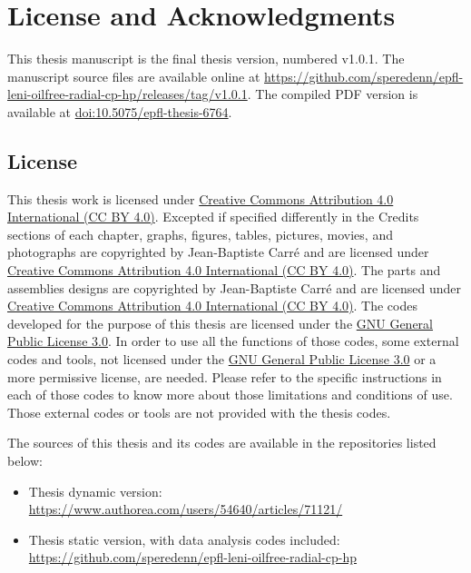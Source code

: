 \chapter{License and Acknowledgments}
\label{chap:licenses}

This thesis manuscript is the final thesis version, numbered
v1.0.1. The manuscript source files are available online at
\href{https://github.com/speredenn/epfl-leni-oilfree-radial-cp-hp/releases/tag/v1.0.1}{https://github.com/speredenn/epfl-leni-oilfree-radial-cp-hp/releases/tag/v1.0.1}. The
compiled PDF version is available at
\href{http://dx.doi.org/10.5075/epfl-thesis-6764}{doi:10.5075/epfl-thesis-6764}.

\section*{License}
\label{sec:licenses}

This thesis work is licensed under
\href{http://creativecommons.org/licenses/by/4.0/}{Creative Commons
  Attribution 4.0 International (CC BY
  4.0)}. Excepted
if specified differently in the Credits sections of each chapter,
graphs, figures, tables, pictures, movies, and photographs are
copyrighted by Jean-Baptiste Carré and are licensed under
\href{http://creativecommons.org/licenses/by/4.0/}{Creative Commons
  Attribution 4.0 International (CC BY 4.0)}. The parts and assemblies
designs are copyrighted by Jean-Baptiste Carré and are licensed under
\href{http://creativecommons.org/licenses/by/4.0/}{Creative Commons
  Attribution 4.0 International (CC BY 4.0)}. The codes developed for
the purpose of this thesis are licensed under the
\href{http://www.gnu.org/licenses/gpl.html}{GNU General Public License
  3.0}. In order to use
all the functions of those codes, some external codes and tools, not
licensed under the \href{http://www.gnu.org/licenses/gpl.html}{GNU
  General Public License 3.0} or a more permissive license, are
needed. Please refer to the specific instructions in each of those
codes to know more about those limitations and conditions of
use. Those external codes or tools are not provided with the thesis
codes.

The sources of this thesis and its codes are available in the
repositories listed below:

\begin{itemize}
\item Thesis dynamic version:\\ \href{https://www.authorea.com/users/54640/articles/71121/}{https://www.authorea.com/users/54640/articles/71121/}
\item Thesis static version, with data analysis codes included:\\ \href{https://github.com/speredenn/epfl-leni-oilfree-radial-cp-hp}{https://github.com/speredenn/epfl-leni-oilfree-radial-cp-hp}
\end{itemize}

